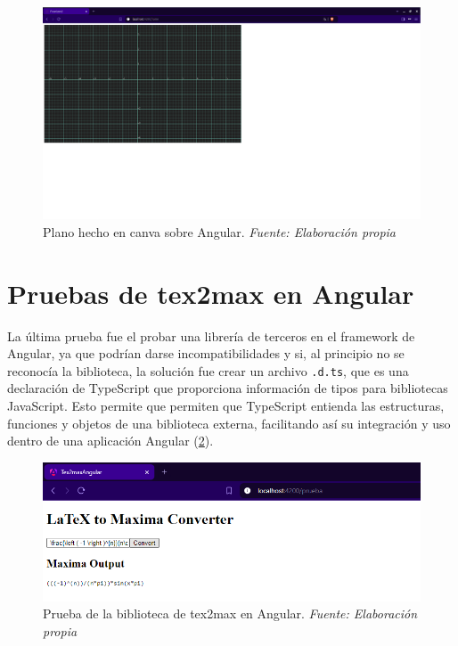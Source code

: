 \begin{figure}[H]
	\centering
	\includegraphics[width=1\textwidth]{img/chapter06/prueba_canva_angular.png}
	\caption[Plano hecho en canva sobre Angular.]{Plano hecho en canva sobre Angular. \textit{Fuente: Elaboración propia}}
	\label{fig:prueba_canva_angular}
\end{figure}

\section{Pruebas de tex2max en Angular}
La última prueba fue el probar una librería de terceros en el framework de Angular, ya que podrían darse incompatibilidades y si, al principio no se reconocía la biblioteca, la solución fue crear un archivo \texttt{.d.ts}, que es una declaración de TypeScript que proporciona información de tipos para bibliotecas JavaScript. Esto permite que permiten que TypeScript entienda las estructuras, funciones y objetos de una biblioteca externa, facilitando así su integración y uso dentro de una aplicación Angular (\ref{fig:tex2max_angular}).
\begin{figure}[H]
	\centering
	\includegraphics[width=1\textwidth]{img/chapter06/tex2max_angular.png}
	\caption[Prueba de la biblioteca de tex2max en Angular.]{Prueba de la biblioteca de tex2max en Angular. \textit{Fuente: Elaboración propia}}
	\label{fig:tex2max_angular}
\end{figure}